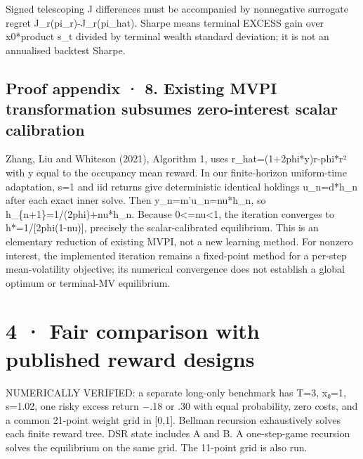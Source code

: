 \documentclass[10pt,a4paper]{article}
\begin{document}
Signed telescoping J differences must be accompanied by nonnegative surrogate regret J\_r(pi\_r)-J\_r(pi\_hat). Sharpe means terminal EXCESS gain over x0*product s\_t divided by terminal wealth standard deviation; it is not an annualised backtest Sharpe.

\subsection*{Proof appendix · 8. Existing MVPI transformation subsumes zero-interest scalar calibration}
Zhang, Liu and Whiteson (2021), Algorithm 1, uses r\_hat=(1+2phi*y)r-phi*r² with y equal to the occupancy mean reward. In our finite-horizon uniform-time adaptation, s=1 and iid returns give deterministic identical holdings u\_n=d*h\_n after each exact inner solve. Then y\_n=m'u\_n=nu*h\_n, so h\_\{n+1\}=1/(2phi)+nu*h\_n. Because 0<=nu<1, the iteration converges to h*=1/[2phi(1-nu)], precisely the scalar-calibrated equilibrium. This is an elementary reduction of existing MVPI, not a new learning method. For nonzero interest, the implemented iteration remains a fixed-point method for a per-step mean-volatility objective; its numerical convergence does not establish a global optimum or terminal-MV equilibrium.

\clearpage
\section*{4 · Fair comparison with published reward designs}
NUMERICALLY VERIFIED: a separate long-only benchmark has T=3, x₀=1, s=1.02, one risky excess return −.18 or .30 with equal probability, zero costs, and a common 21-point weight grid in [0,1]. Bellman recursion exhaustively solves each finite reward tree. DSR state includes A and B. A one-step-game recursion solves the equilibrium on the same grid. The 11-point grid is also run.
\end{document}
